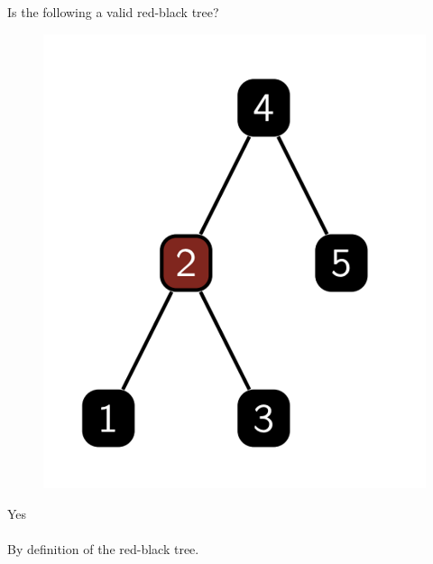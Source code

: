 \documentclass [12pt]{article}
\begin{document}
\section{} Is the following a valid red-black tree? 
\begin{figure}[H]
    \centering
    \includegraphics[scale=0.5]{pic2.png} 
    \label{fig:my_label}
\end{figure}

\begin{Solution}
Yes
\paragraph{}
By definition of the red-black tree.
\end{Solution}
\end{document}

